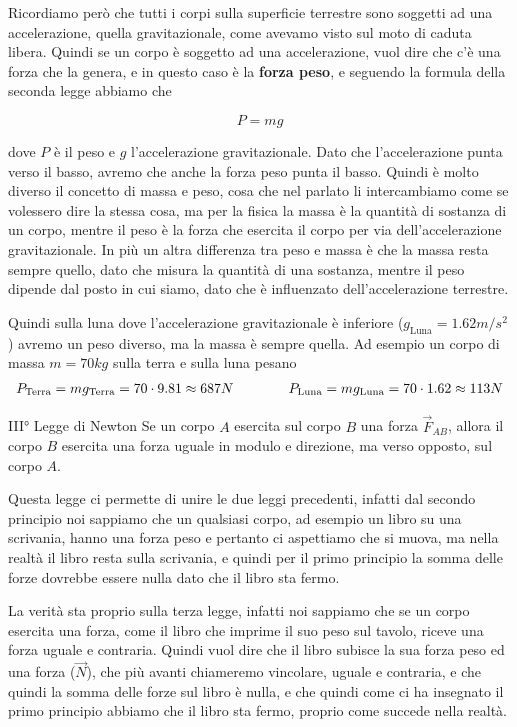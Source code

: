 \documentclass{rapport}
\begin{document}
Ricordiamo però che tutti i corpi sulla superficie terrestre sono soggetti ad una accelerazione, quella gravitazionale, come avevamo visto sul moto di caduta libera. Quindi se un corpo è soggetto ad una accelerazione, vuol dire che c'è una forza che la genera, e in questo caso è la \textbf{forza peso}, e seguendo la formula della seconda legge abbiamo che 

\[
P = mg
\]

dove $P$ è il peso e $g$ l'accelerazione gravitazionale. Dato che l'accelerazione punta verso il basso, avremo che anche la forza peso punta il basso. Quindi è molto diverso il concetto di massa e peso, cosa che nel parlato li intercambiamo come se volessero dire la stessa cosa, ma per la fisica la massa è la quantità di sostanza di un corpo, mentre il peso è la forza che esercita il corpo per via dell'accelerazione gravitazionale. In più un altra differenza tra peso e massa è che la massa resta sempre quello, dato che misura la quantità di una sostanza, mentre il peso dipende dal posto in cui siamo, dato che è influenzato dell'accelerazione terrestre. 

Quindi sulla luna dove l'accelerazione gravitazionale è inferiore ($g_{\text{Luna}} = 1.62m/s^2$) avremo un peso diverso, ma la massa è sempre quella. Ad esempio un corpo di massa $m=70kg$ sulla terra e sulla luna pesano 
\[
\begin{array}{c@{\qquad}@{\qquad} c}
  P_{\text{Terra}} = mg_{\text{Terra}} = 70 \cdot 9.81 \approx 687N & P_{\text{Luna}} = mg_{\text{Luna}} = 70 \cdot 1.62 \approx 113N 
\end{array}
\]


\begin{legge}{III° Legge di Newton}{}
  Se un corpo $A$ esercita sul corpo $B$ una forza $\vec{F}_{AB}$, allora il corpo $B$ esercita una forza uguale in modulo e direzione, ma verso opposto, sul corpo $A$.
\end{legge}
Questa legge ci permette di unire le due leggi precedenti, infatti dal secondo principio noi sappiamo che un qualsiasi corpo, ad esempio un libro su una scrivania, hanno una forza peso e pertanto ci aspettiamo che si muova, ma nella realtà il libro resta sulla scrivania, e quindi per il primo principio la somma delle forze dovrebbe essere nulla dato che il libro sta fermo. 

La verità sta proprio sulla terza legge, infatti noi sappiamo che se un corpo esercita una forza, come il libro che imprime il suo peso sul tavolo, riceve una forza uguale e contraria. Quindi vuol dire che il libro subisce la sua forza peso ed una forza ($\vec{N}$), che più avanti chiameremo vincolare, uguale e contraria, e che quindi la somma delle forze sul libro è nulla, e che quindi come ci ha insegnato il primo principio abbiamo che il libro sta fermo, proprio come succede nella realtà. 
\end{document}

